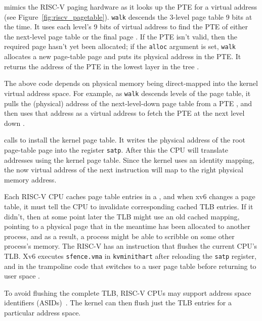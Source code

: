 mimics the RISC-V paging hardware as it
looks up the PTE for a virtual address (see
Figure~\ref{fig:riscv_pagetable}).
\lstinline{walk}
descends the 3-level page table 9 bits at the time.
It uses each level's 9 bits of virtual address to find
the PTE of either the next-level page table or the final page
.
If the PTE isn't valid, then
the required page hasn't yet been allocated;
if the
\lstinline{alloc}
argument is set,
\lstinline{walk}
allocates a new page-table page and puts its physical address in the PTE.
It returns the address of the PTE in the lowest layer in the tree
.

The above code depends on physical memory being direct-mapped into the
kernel virtual address space. For example, as \lstinline{walk} descends levels
of the page table, it pulls the (physical) address of the
next-level-down page table from a PTE ,
and then uses that address as a
virtual address to fetch the PTE at the next level down
.

calls
to install the kernel page table.
It writes the physical address of the root page-table page
into the register
\texttt{satp}.
After this the CPU will translate addresses using the kernel
page table.  Since the kernel uses an identity mapping, the now
virtual address of the next instruction will map to the right physical
memory address.

Each RISC-V CPU caches page table entries in a
, and when xv6 changes
a page table, it must tell the CPU to invalidate corresponding
cached TLB entries.  If it didn't,
then at some point later the TLB might
use an old cached mapping, pointing to a physical page that in the meantime
has been allocated to another process, and as a result, a process
might be able to scribble on some other process's memory.  The RISC-V
has an instruction  that flushes
the current CPU's TLB.
Xv6 executes {\tt sfence.vma} in {\tt kvminithart}  after reloading the 
\texttt{satp} register, and in the trampoline code that
switches to a user page table before returning to user space
.

To avoid flushing the complete TLB, RISC-V CPUs may support address
space identifiers (ASIDs)~\cite{riscv:priv}.  The kernel can then
flush just the TLB entries for a particular address space.


